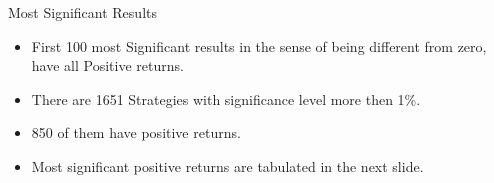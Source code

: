 \documentclass[aspectratio=169]{beamer}
\begin{document}
\begin{frame}{Most Significant Results}
	\begin{itemize}
		\item First 100 most Significant results in the sense of being different from zero, have all Positive returns.
		\item There are 1651 Strategies with significance level more then 1\%.
		\item 850 of them have positive returns.
		\item Most significant positive returns are tabulated in the next slide.
	\end{itemize}
\end{frame}
\end{document}
